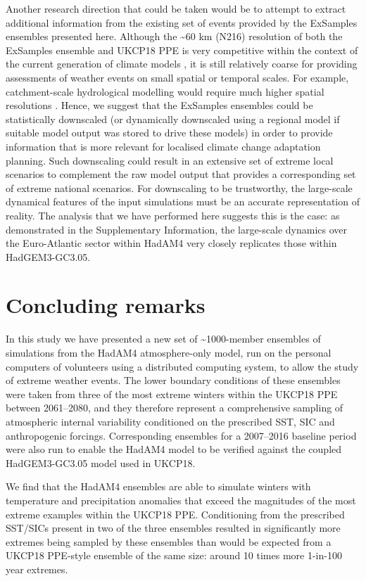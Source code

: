   Another research direction that could be taken would be to attempt to extract additional information from the existing set of events provided by the ExSamples ensembles presented here. Although the \textasciitilde60 km (N216) resolution of both the ExSamples ensemble and UKCP18 PPE is very competitive within the context of the current generation of climate models \citep{cmip6_source_id_values_cmip6_2022,eyring_overview_2016}, it is still relatively coarse for providing assessments of weather events on small spatial or temporal scales. For example, catchment-scale hydrological modelling would require much higher spatial resolutions \citep{charlton_assessing_2006}. Hence, we suggest that the ExSamples ensembles could be statistically downscaled (or dynamically downscaled using a regional model if suitable model output was stored to drive these models) in order to provide information that is more relevant for localised climate change adaptation planning. Such downscaling could result in an extensive set of extreme local scenarios to complement the raw model output that provides a corresponding set of extreme national scenarios. For downscaling to be trustworthy, the large-scale dynamical features of the input simulations must be an accurate representation of reality. The analysis that we have performed here suggests this is the case: as demonstrated in the Supplementary Information, the large-scale dynamics over the Euro-Atlantic sector within HadAM4 very closely replicates those within HadGEM3-GC3.05.
    
\section{Concluding remarks}

  In this study we have presented a new set of \textasciitilde1000-member ensembles of simulations from the HadAM4 atmosphere-only model, run on the personal computers of volunteers using a distributed computing system, to allow the study of extreme weather events. The lower boundary conditions of these ensembles were taken from three of the most extreme winters within the UKCP18 PPE between 2061--2080, and they therefore represent a comprehensive sampling of atmospheric internal variability conditioned on the prescribed SST, SIC and anthropogenic forcings. Corresponding ensembles for a 2007--2016 baseline period were also run to enable the HadAM4 model to be verified against the coupled HadGEM3-GC3.05 model used in UKCP18.
  
  We find that the HadAM4 ensembles are able to simulate winters with temperature and precipitation anomalies that exceed the magnitudes of the most extreme examples within the UKCP18 PPE. Conditioning from the prescribed SST/SICs present in two of the three ensembles resulted in significantly more extremes being sampled by these ensembles than would be expected from a UKCP18 PPE-style ensemble of the same size: around 10 times more 1-in-100 year extremes.
  

